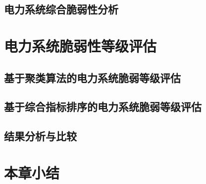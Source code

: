 \subsection{电力系统综合脆弱性分析}
\label{sec:singleAnalysis}





\section{电力系统脆弱性等级评估}
\label{sec:multiAssessment}




\subsection{基于聚类算法的电力系统脆弱等级评估}
\label{sec:multiVSsingle}




\subsection{基于综合指标排序的电力系统脆弱等级评估}
\label{sec:multiAnalysis}





\subsection{结果分析与比较}




\section{本章小结}
\label{sec:sum5}


